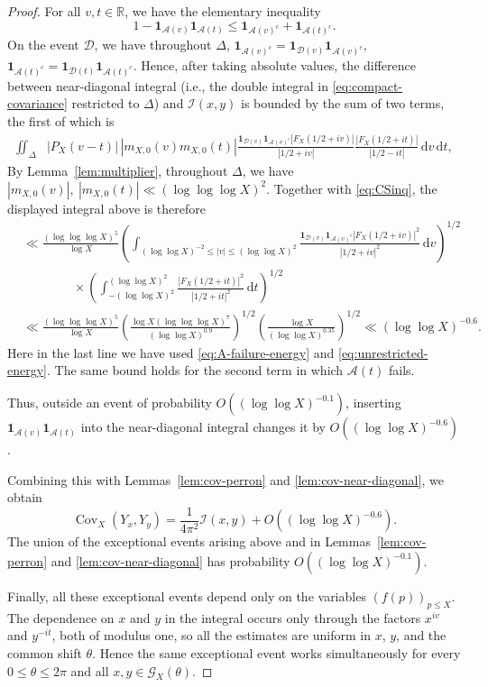 \documentclass[a4paper,12pt,reqno]{amsart}
\numberwithin{equation}{section}
\theoremstyle{remark}
\newcommand{\cov}{\operatorname{Cov}}
\begin{document}
\begin{proof}
For all $v,t\in\mathbb R$, we have the elementary inequality
\[
 1-\mathbf 1_{{\mathcal A}(v)}
      \mathbf 1_{{\mathcal A}(t)}
 \leq
 \mathbf 1_{{\mathcal A}(v)^c}
 +
 \mathbf 1_{{\mathcal A}(t)^c}.
\]
On the event ${\mathcal D}$, we have throughout $\Delta$, \(
 \mathbf 1_{{\mathcal A}(v)^c}
 =
 \mathbf 1_{{\mathcal D}(v)}
 \mathbf 1_{{\mathcal A}(v)^c},\) \( \mathbf 1_{{\mathcal A}(t)^c}
 =
 \mathbf 1_{{\mathcal D}(t)}
 \mathbf 1_{{\mathcal A}(t)^c}.
\)
Hence, after taking absolute values, the difference between near-diagonal integral (i.e., the double
integral in \eqref{eq:compact-covariance} restricted to $\Delta$) and
${\mathcal I}(x,y)$ is bounded by the sum of two terms, the first of
which is
\[
 \begin{aligned}
 \iint_{\Delta}
 &|P_X(v-t)|\,|m_{X,0}(v)m_{X,0}(t)|
 \frac{
 \mathbf 1_{{\mathcal D}(v)}
 \mathbf 1_{{\mathcal A}(v)^c}
 |F_X(1/2+iv)|
 }{|1/2+iv|}
 \frac{|F_X(1/2+it)|}{|1/2-it|}
 \,\mathrm{d}v\,\mathrm{d}t,
 \end{aligned}
\]
By Lemma~\ref{lem:multiplier}, throughout $\Delta$, we have
\(
 |m_{X,0}(v)|,\ |m_{X,0}(t)|
 \ll(\log\log\log X)^2.
\)
Together with \eqref{eq:CSinq}, the displayed integral above is therefore
\[
 \begin{aligned}
 &\ll
 \frac{(\log\log\log X)^5}{\log X}
 \left(
 \int_{(\log\log X)^{-2}\leq|v|\leq(\log\log X)^2}
 \frac{
 \mathbf 1_{{\mathcal D}(v)}
 \mathbf 1_{{\mathcal A}(v)^c}
 |F_X(1/2+iv)|^2}
 {|1/2+iv|^2}\,\mathrm{d}v
 \right)^{1/2}\\
 &\qquad\qquad\times
 \left(
 \int_{-(\log\log X)^2}^{(\log\log X)^2}
 \frac{|F_X(1/2+it)|^2}
 {|1/2+it|^2}\,\mathrm{d}t
 \right)^{1/2}\\
 &\ll
 \frac{(\log\log\log X)^5}{\log X}
 \left(
 \frac{\log X(\log\log\log X)^7}
      {(\log\log X)^{0.9}}
 \right)^{1/2}
 \left(
 \frac{\log X}
      {(\log\log X)^{0.35}}
 \right)^{1/2}\ll
 (\log\log X)^{-0.6}.
 \end{aligned}
\]
Here in the last  line we have used \eqref{eq:A-failure-energy} and
\eqref{eq:unrestricted-energy}. The same bound holds for the second term in which ${\mathcal A}(t)$ fails.

Thus, outside an event of probability
$O((\log\log X)^{-0.1})$, inserting
$\mathbf 1_{{\mathcal A}(v)}\mathbf 1_{{\mathcal A}(t)}$ into the
near-diagonal integral changes it by
$O((\log\log X)^{-0.6})$.

Combining this with Lemmas~\ref{lem:cov-perron} and
\ref{lem:cov-near-diagonal}, we obtain
\[
 \cov_X(Y_x,Y_y)
 =
 \frac1{4\pi^2}{\mathcal I}(x,y)
 +O((\log\log X)^{-0.6}).
\]
The union of the exceptional events arising above and in
Lemmas~\ref{lem:cov-perron} and \ref{lem:cov-near-diagonal}
has probability $O((\log\log X)^{-0.1})$.

Finally, all these exceptional events depend only on the variables
$(f(p))_{p\leq X}$.  The dependence on $x$ and $y$ in the integral occurs
only through the factors $x^{iv}$ and $y^{-it}$, both of modulus one, so
all the estimates are uniform in $x$, $y$, and the common shift
$\theta$.  Hence the same exceptional event works simultaneously for
every $0\leq\theta\leq2\pi$ and all
$x,y\in{\mathcal G}_X(\theta)$.
\end{proof}
\end{document}
